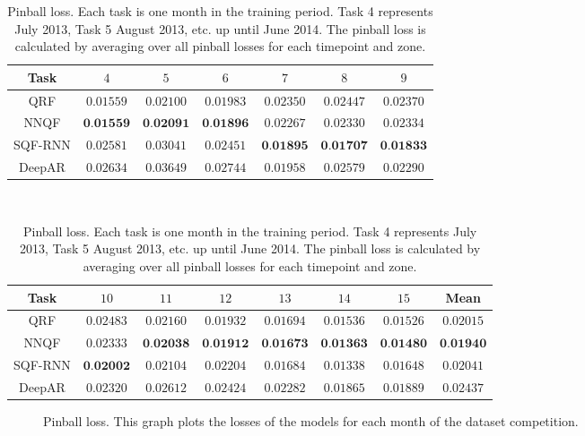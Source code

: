 \begin{table}[ht]%
    \footnotesize
    \hspace*{25pt} %
    \begin{minipage}{\textwidth}
    \renewcommand{\b}[1]{\textbf{#1}}
    \begin{tabular}{c|cccccc}
        \toprule \noalign{\smallskip}
        Task & \(4\) & \(5\) & \(6\) & \(7\) & \(8\) & \(9\) \\
        \midrule
        QRF     & \(0.01559\)     & \(0.02100\)     & \(0.01983\)     & \(0.02350\)     & \(0.02447\)     & \(0.02370\)     \\
        NNQF    & \(\b{0.01559}\) & \(\b{0.02091}\) & \(\b{0.01896}\) & \(0.02267\)     & \(0.02330\)     & \(0.02334\)     \\
        SQF-RNN & \(0.02581\)     & \(0.03041\)     & \(0.02451\)     & \(\b{0.01895}\) & \(\b{0.01707}\) & \(\b{0.01833}\) \\
        DeepAR  & \(0.02634\)     & \(0.03649\)     & \(0.02744\)     & \(0.01958\)     & \(0.02579\)     & \(0.02290\)     \\
        \bottomrule
    \end{tabular}
    \vspace*{1em} \\
    \begin{tabular}{c|cccccc|c}
        \toprule \noalign{\smallskip}
        Task & \(10\) & \(11\) & \(12\) & \(13\) & \(14\) & \(15\) & Mean \\
        \midrule
        QRF     & \(0.02483\)     & \(0.02160\)     & \(0.01932\)     & \(0.01694\)     & \(0.01536\)     & \(0.01526\)     & \(0.02015\)     \\
        NNQF    & \(0.02333\)     & \(\b{0.02038}\) & \(\b{0.01912}\) & \(\b{0.01673}\) & \(\b{0.01363}\) & \(\b{0.01480}\) & \(\b{0.01940}\) \\
        SQF-RNN & \(\b{0.02002}\) & \(0.02104\)     & \(0.02204\)     & \(0.01684\)     & \(0.01338\)     & \(0.01648\)     & \(0.02041\)     \\
        DeepAR  & \(0.02320\)     & \(0.02612\)     & \(0.02424\)     & \(0.02282\)     & \(0.01865\)     & \(0.01889\)     & \(0.02437\)     \\
        \bottomrule
    \end{tabular}
    \end{minipage}

    \caption[Pinball loss]{Pinball loss. 
    Each task is one month in the training period. 
    Task 4 represents July 2013, Task 5 August 2013, etc. up until June 2014.
    The pinball loss is calculated by averaging 
    over all pinball losses for each timepoint and zone.}
    \label{table:pinball-loss}
\end{table}

\begin{figure}[ht]
    \centering
    
    \caption[Pinball loss]{Pinball loss. 
    This graph plots the losses of the models for each month of the dataset competition.}
    \label{fig:pinball-loss}
\end{figure}